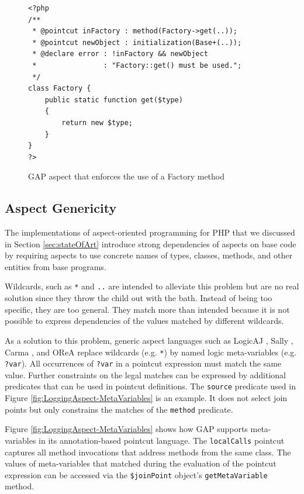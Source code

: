 \documentclass{acm_proc_article-sp}
\begin{document}
\begin{figure}[t]
\centering \small{
\begin{verbatim}
<?php
/**
 * @pointcut inFactory : method(Factory->get(..));
 * @pointcut newObject : initialization(Base+(..));
 * @declare error : !inFactory && newObject
 *                : "Factory::get() must be used.";
 */
class Factory {
    public static function get($type)
    {
        return new $type;
    }
}
?>
\end{verbatim}}
\caption{GAP aspect that enforces the use of a Factory method}
\label{fig:FactoryEnforcement}
\end{figure}

\subsection{Aspect Genericity}
The implementations of aspect-oriented programming for PHP that we
discussed in Section \ref{sec:stateOfArt} introduce strong
dependencies of aspects on base code by requiring aspects to use
concrete names of types, classes, methods, and other entities from
base programs.

Wildcards, such as \texttt{*} and \texttt{..} are intended to alleviate this
problem but are no real solution since they throw the child out with the bath.
Instead of being too specific, they are too general. They match more than
intended because it is not possible to express dependencies of the values
matched by different wildcards.

As a solution to this problem, generic aspect languages
\cite{kr06} such as LogicAJ \cite{windeln03}, Sally \cite{sh03},
Carma \cite{kg03}, and OReA \cite{mdh04} replace wildcards (e.g.
\texttt{*}) by named logic meta-variables (e.g. \texttt{?var}).
All occurrences of \texttt{?var} in a pointcut expression must match
the same value. Further constraints on the legal matches can be expressed
by additional predicates that can be used in pointcut definitions. The
\texttt{source} predicate used in Figure \ref{fig:LoggingAspect-MetaVariables}
is an example. It does not select join points but only constrains the
matches of the \texttt{method} predicate.

Figure \ref{fig:LoggingAspect-MetaVariables} shows how GAP supports
meta-variables in its annotation-based pointcut language. The
\texttt{localCalls} pointcut captures all method invocations that
address methods from the same class. The values of meta-variables that
matched during the evaluation of the pointcut expression can be accessed
via the \texttt{\$joinPoint} object's \texttt{getMetaVariable} method.
\end{document}
